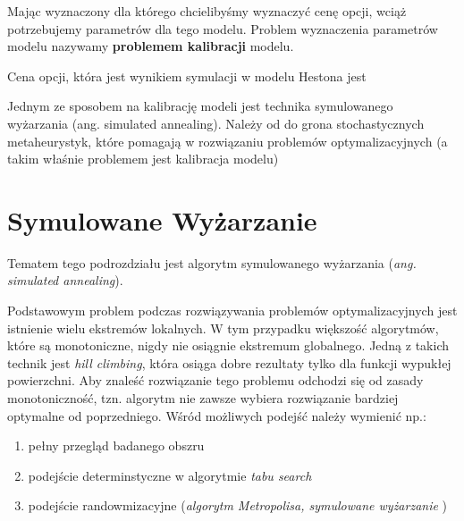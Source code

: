 \documentclass{pracamgr}
\begin{document}
Mając wyznaczony dla którego chcielibyśmy wyznaczyć cenę opcji, wciąż potrzebujemy parametrów dla tego modelu. 
Problem wyznaczenia parametrów modelu nazywamy \textbf{problemem kalibracji} modelu.  

Cena opcji, która jest wynikiem symulacji w modelu Hestona jest 

Jednym ze sposobem na kalibrację modeli jest technika symulowanego wyżarzania (ang. simulated annealing). Należy od do 
grona stochastycznych metaheurystyk, które pomagają w rozwiązaniu problemów optymalizacyjnych (a takim właśnie problemem jest
kalibracja modelu)



\section{Symulowane Wyżarzanie}

Tematem tego podrozdziału jest algorytm symulowanego wyżarzania  (\textit{ang. simulated annealing}). 

Podstawowym problem podczas rozwiązywania problemów optymalizacyjnych jest istnienie wielu ekstremów lokalnych.
W tym przypadku większość algorytmów, które są monotoniczne, nigdy nie osiągnie ekstremum globalnego. Jedną z takich technik jest \textit{hill climbing}, która osiąga dobre rezultaty tylko dla funkcji wypukłej powierzchni.
Aby znaleść rozwiązanie tego problemu odchodzi się od zasady monotoniczność, tzn. algorytm nie zawsze wybiera rozwiązanie bardziej optymalne od poprzedniego. 
Wśród możliwych podejść należy wymienić np.:
\begin{enumerate}
  \item pełny przegląd badanego obszru
  \item podejście determinstyczne w algorytmie \textit{tabu search}
  \item podejście randowmizacyjne (\textit{algorytm Metropolisa, symulowane wyżarzanie} \cite{OptimalizationBySimulatedAnnealing} )
\end{enumerate}


\end{document}
